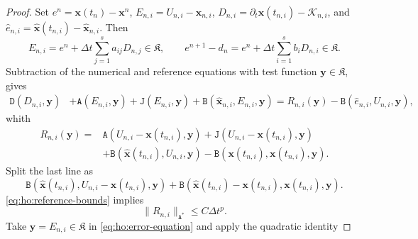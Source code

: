 \documentclass[11pt,a4paper]{article}
\newcommand{\bs}{\boldsymbol}
\newcommand{\dt}{\Delta t}
\newcommand{\DD}{\mathtt D}
\newcommand{\Aform}{\mathtt A}
\newcommand{\JJ}{\mathtt J}
\newcommand{\BB}{\mathtt B}
\theoremstyle{definition}
\numberwithin{equation}{section}
\begin{document}
\begin{proof}
Set $e^n=\bs x(t_n)-\bs x^n$, $E_{n,i}=U_{n,i}-\bs x_{n,i}$,
$D_{n,i}=\partial_t\bs x(t_{n,i})-\mathcal K_{n,i}$, and
$\widehat e_{n,i}=\widehat{\bs x}(t_{n,i})-\widehat{\bs x}_{n,i}$.
Then
\[
 E_{n,i}=e^n+\dt\sum_{j=1}^s a_{ij}D_{n,j}\in \mathfrak K,\qquad
 e^{n+1}-d_n=e^n+\dt\sum_{i=1}^s b_iD_{n,i} \in \mathfrak K.
\]
Subtraction of the
numerical and reference equations with test function $\bs y \in \mathfrak K$, gives
\begin{equation}\label{eq:ho:error-equation}
\begin{aligned}
 \DD(D_{n,i},\bs y)&+\Aform(E_{n,i},\bs y)  +\JJ(E_{n,i},\bs y)
       +\BB(\widehat{\bs x}_{n,i},E_{n,i},\bs y)=R_{n,i}(\bs y)-\BB(\widehat e_{n,i},U_{n,i},\bs y),
\end{aligned}
\end{equation}
whith
\begin{equation}\label{eq:ho:residual}
\begin{aligned}
 R_{n,i}(\bs y)={}&\Aform(U_{n,i}-\bs x(t_{n,i}),\bs y) +\JJ(U_{n,i} - \bs x(t_{n,i}),\bs y)\\
 {}& +\BB(\widehat{\bs x}(t_{n,i}),U_{n,i},\bs y)
       -\BB(\bs x(t_{n,i}),\bs x(t_{n,i}),\bs y).
\end{aligned}
\end{equation}
Split the last line as
$$
\BB(\widehat{\bs x}(t_{n,i}),U_{n,i}-\bs x(t_{n,i}),\bs y)
 +\BB(\widehat{\bs x}(t_{n,i})-\bs x(t_{n,i}),\bs x(t_{n,i}),\bs y).
 $$
\cref{eq:ho:reference-bounds} implies
\begin{equation}\label{eq:ho:residual-bound}
 \|R_{n,i}\|_{\Aform^*}\le C\dt^p.
\end{equation}
%
Take $\bs y=E_{n,i}\in\mathfrak K$ in \eqref{eq:ho:error-equation} and apply the quadratic identity

\end{proof}
\end{document}
